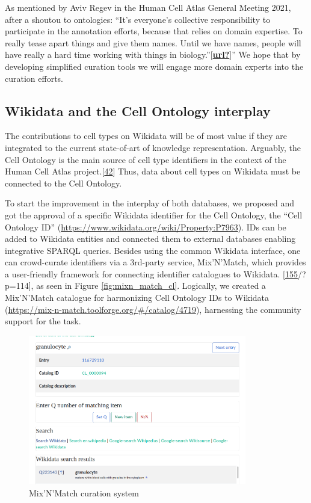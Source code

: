 As mentioned by Aviv Regev in the Human Cell Atlas General Meeting 2021, after a shoutou to ontologies: ``It's everyone's collective
responsibility to participate in the annotation efforts, because that relies on domain expertise. To really tease apart things and give
them names. Until we have names, people will have really a hard time working with things in biology.''{[}\protect\hyperlink{ref-url}{\textbf{url?}}{]}''
We hope that by developing simplified curation tools we will engage more domain experts into the curation efforts.

\hypertarget{wikidata-and-the-cell-ontology-interplay}{%
\subsection{Wikidata and the Cell Ontology interplay}\label{wikidata-and-the-cell-ontology-interplay}}

The contributions to cell types on Wikidata will be of most value if they are integrated to the current state-of-art of knowledge representation.
Arguably, the Cell Ontology is the main source of cell type identifiers in the context of the Human Cell Atlas project.{[}\protect\hyperlink{ref-qT8WxqjA}{42}{]}
Thus, data about cell types on Wikidata must be connected to the Cell Ontology.

To start the improvement in the interplay of both databases, we proposed and got the approval of a specific Wikidata identifier for the Cell Ontology, the ``Cell Ontology ID'' (\url{https://www.wikidata.org/wiki/Property:P7963}).
IDs can be added to Wikidata entities and connected them to external databases enabling integrative SPARQL queries.
Besides using the common Wikidata interface, one can crowd-curate identifiers via a 3rd-party service, Mix'N'Match, which provides a user-friendly framework for connecting identifier catalogues to Wikidata. {[}\protect\hyperlink{ref-JgiKEEdq}{155}/?p=114{]}, as seen in Figure \ref{fig:mixn_match_cl}.
Logically, we created a Mix'N'Match catalogue for harmonizing Cell Ontology IDs to Wikidata (\url{https://mix-n-match.toolforge.org/\#/catalog/4719}), harnessing the community support for the task.

\begin{figure}
\hypertarget{fig:mixnmatch_cl}{%
\centering
\includegraphics[width=0.85\textwidth,height=\textheight]{images/image-17.png}
\caption{Mix'N'Match curation system}\label{fig:mixnmatch_cl}
}
\end{figure}

